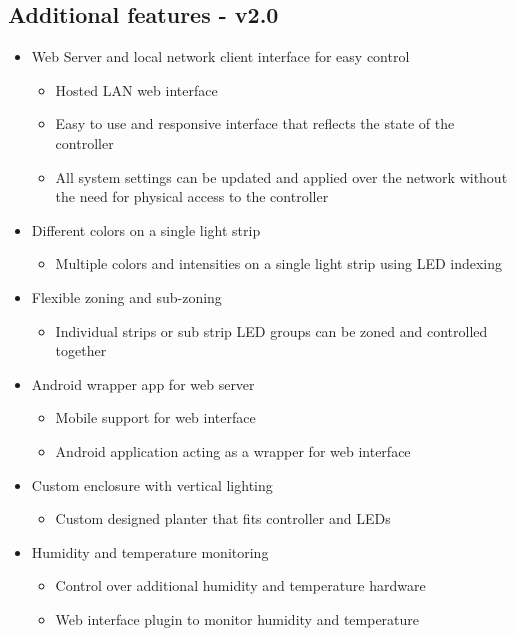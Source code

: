 \documentclass[onecolumn, draftclsnofoot,10pt, compsoc]{IEEEtran}
\begin{document}
	\subsection*{Additional features - v2.0}
	\begin{itemize}
		\item Web Server and local network client interface for easy control
		\begin{itemize}
			\item Hosted LAN web interface
			\item Easy to use and responsive interface that reflects the state of the controller
			\item All system settings can be updated and applied over the network without the need for physical access to the controller
		\end{itemize}
		\item Different colors on a single light strip
			\begin{itemize}
				\item Multiple colors and intensities on a single light strip using LED indexing
			\end{itemize}
		\item Flexible zoning and sub-zoning
			\begin{itemize}
				\item Individual strips or sub strip LED groups can be zoned and controlled together
			\end{itemize}
		\item Android wrapper app for web server
			\begin{itemize}
				\item Mobile support for web interface
				\item Android application acting as a wrapper for web interface
			\end{itemize}
		\item Custom enclosure with vertical lighting
			\begin{itemize}
				\item Custom designed planter that fits controller and LEDs
			\end{itemize}
		\item Humidity and temperature monitoring
			\begin{itemize}
				\item Control over additional humidity and temperature hardware
				\item Web interface plugin to monitor humidity and temperature
			\end{itemize}
	\end{itemize}
\end{document}
